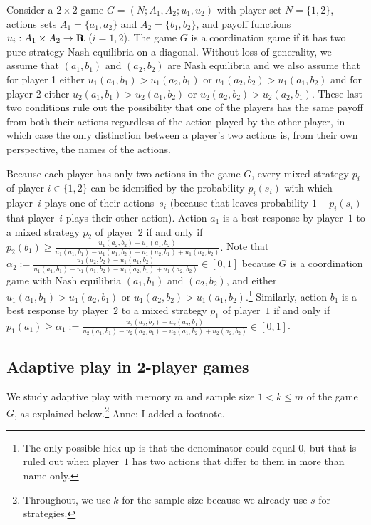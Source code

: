 \documentclass[11.5pt]{article}
\begin{document}
Consider a $2\times 2$ game $G=(N;A_1,A_2;u_1, u_2)$ with player set $N=\{1,2\}$, actions sets $A_1=\{a_1,a_2\}$ and $A_2=\{b_1,b_2\}$, and payoff functions $u_i: A_1\times A_2 \rightarrow \bf{R}$ ($i=1,2$). The game $G$ is a coordination game if it has two pure-strategy Nash equilibria on a diagonal. Without loss of generality, we assume that $(a_1,b_1)$ and $(a_2,b_2)$ are Nash equilibria and we also assume that for player 1 either $u_1(a_1,b_1) > u_1(a_2,b_1)$ or $u_1(a_2,b_2) > u_1(a_1,b_2)$ and for player 2 either $u_2(a_1,b_1) > u_2(a_1,b_2)$ or $u_2(a_2,b_2) > u_2(a_2,b_1)$. These last two conditions rule out the possibility that one of the players has the same payoff from both their actions regardless of the action played by the other player, in which case the only distinction between a player's two actions is, from their own perspective, the names of the actions. %

Because each player has only two actions in the game $G$, every mixed strategy $p_i$ of player $i\in \{1,2\}$ can be identified by the probability $p_i(s_i)$ with which player~$i$ plays one of their actions~$s_i$ (because that leaves probability $1-p_i(s_i)$ that player~$i$ plays their other action). 
%
Action $a_1$ is a best response by player~$1$ to a mixed strategy $p_2$ of player~$2$ if and only if 
$p_2(b_1) \geq \frac{u_1(a_2,b_2)-u_1(a_1,b_2)}{u_1(a_1,b_1)-u_1(a_1,b_2)-u_1(a_2,b_1)+u_1(a_2,b_2)}.$ Note that $\alpha_2 :=\frac{u_1(a_2,b_2)-u_1(a_1,b_2)}{u_1(a_1,b_1)-u_1(a_1,b_2)-u_1(a_2,b_1)+u_1(a_2,b_2)}\in [0,1]$ because $G$ is a coordination game with Nash equilibria $(a_1,b_1)$ and $(a_2,b_2)$, and either $u_1(a_1,b_1) > u_1(a_2,b_1)$ or $u_1(a_2,b_2) > u_1(a_1,b_2)$.\footnote{The only possible hick-up is that the denominator could equal 0, but that is ruled out when player~$1$ has two actions that differ to them in more than name only.}
%
Similarly, action $b_1$ is a best response by player~$2$ to a mixed strategy $p_1$ of player~$1$ if and only if 
$p_1(a_1) \geq \alpha_1 := \frac{u_2(a_2,b_2)-u_2(a_2,b_1)}{u_2(a_1,b_1)-u_2(a_2,b_1)-u_2(a_1,b_2)+u_2(a_2,b_2)} \in [0,1]$.


\subsection{Adaptive play in 2-player games}
 
We study adaptive play \citep{young1993evolution} with memory $m$ and sample size $1<k\leq m$ of the game~$G$, as explained below.\footnote{Throughout, we use $k$ for the sample size because we already use $s$ for strategies.} 
Anne: I added a footnote.
\end{document}
